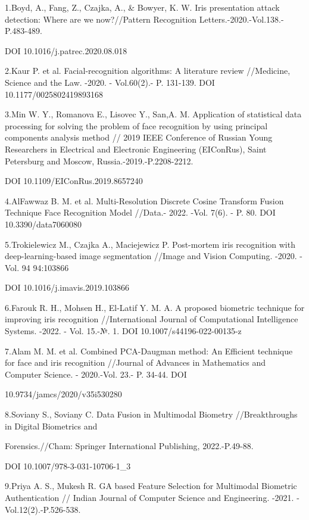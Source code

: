 \begin{noparindent}
1.Boyd, A., Fang, Z., Czajka, A., \& Bowyer, K. W. Iris presentation
attack detection: Where are we now?//Pattern Recognition
Letters.-2020.-Vol.138.-P.483-489.

DOI 10.1016/j.patrec.2020.08.018

2.Kaur P. et al. Facial-recognition algorithms: A literature review
//Medicine, Science and the Law. -2020. - Vol.60(2).- P. 131-139. DOI
10.1177/0025802419893168

3.Min W. Y., Romanova E., Lisovec Y., San,A. M. Application of
statistical data processing for solving the problem of face recognition
by using principal components analysis method // 2019 IEEE Conference of
Russian Young Researchers in Electrical and Electronic Engineering
(EIConRus), Saint Petersburg and Moscow, Russia.-2019.-P.2208-2212.

DOI 10.1109/EIConRus.2019.8657240

4.AlFawwaz B. M. et al. Multi-Resolution Discrete Cosine Transform
Fusion Technique Face Recognition Model //Data.- 2022. -Vol. 7(6). - P.
80. DOI 10.3390/data7060080

5.Trokielewicz M., Czajka A., Maciejewicz P. Post-mortem iris
recognition with deep-learning-based image segmentation //Image and
Vision Computing. -2020. - Vol. 94 94:103866

DOI 10.1016/j.imavis.2019.103866

6.Farouk R. H., Mohsen H., El-Latif Y. M. A. A proposed biometric
technique for improving iris recognition //International Journal of
Computational Intelligence Systems. -2022. - Vol. 15.-№. 1. DOI
10.1007/s44196-022-00135-z

7.Alam M. M. et al. Combined PCA-Daugman method: An Efficient technique
for face and iris recognition //Journal of Advances in Mathematics and
Computer Science. - 2020.-Vol. 23.- P. 34-44. DOI

10.9734/jamcs/2020/v35i530280

8.Soviany S., Soviany C. Data Fusion in Multimodal Biometry
//Breakthroughs in Digital Biometrics and

Forensics.//Cham: Springer
International Publishing, 2022.-P.49-88.

DOI 10.1007/978-3-031-10706-1\_3

9.Priya A. S., Mukesh R. GA based Feature Selection for Multimodal
Biometric Authentication // Indian Journal of Computer Science and
Engineering. -2021. -Vol.12(2).-P.526-538.


\end{noparindent}
